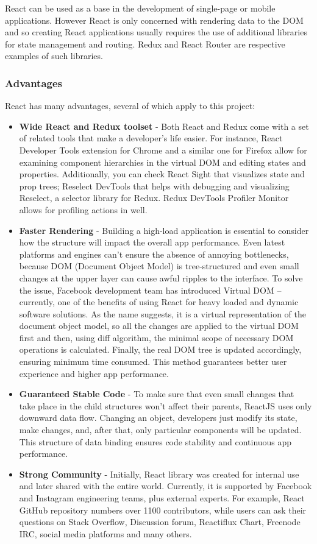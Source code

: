 React can be used as a base in the development of single-page or mobile 
applications. However React is only concerned with rendering data to the DOM and
so creating React applications usually requires the use of additional libraries 
for state management and routing. Redux and React Router are respective examples
of such libraries. 

\subsubsection{Advantages}
React has many advantages, several of which apply to this project:

\begin{itemize}
    \item \textbf{Wide React and Redux toolset} - Both React and Redux come with a set of related tools that make a developer’s life easier. For instance, React Developer Tools extension for Chrome and a similar one for Firefox allow for examining component hierarchies in the virtual DOM and editing states and properties. Additionally, you can check React Sight that visualizes state and prop trees; Reselect DevTools that helps with debugging and visualizing Reselect, a selector library for Redux. Redux DevTools Profiler Monitor allows for profiling actions in well.
    \item \textbf{Faster Rendering} - Building a high-load application is essential to consider how the structure will impact the overall app performance. Even latest platforms and engines can't ensure the absence of annoying bottlenecks, because DOM (Document Object Model) is tree-structured and even small changes at the upper layer can cause awful ripples to the interface. To solve the issue, Facebook development team has introduced Virtual DOM – currently, one of the benefits of using React for heavy loaded and dynamic software solutions. As the name suggests, it is a virtual representation of the document object model, so all the changes are applied to the virtual DOM first and then, using diff algorithm, the minimal scope of necessary DOM operations is calculated. Finally, the real DOM tree is updated accordingly, ensuring minimum time consumed. This method guarantees better user experience and higher app performance.
    \item \textbf{Guaranteed Stable Code} - To make sure that even small changes that take place in the child structures won't affect their parents, ReactJS uses only downward data flow. Changing an object, developers just modify its state, make changes, and, after that, only particular components will be updated. This structure of data binding ensures code stability and continuous app performance.
    \item \textbf{Strong Community} - Initially, React library was created for internal use and later shared with the entire world. Currently, it is supported by Facebook and Instagram engineering teams, plus external experts. For example, React GitHub repository numbers over 1100 contributors, while users can ask their questions on Stack Overflow, Discussion forum, Reactiflux Chart, Freenode IRC, social media platforms and many others.
\end{itemize}

